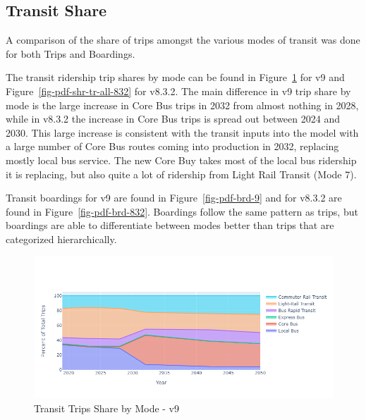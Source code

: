 \documentclass[
  letterpaper,
  DIV=11,
  numbers=noendperiod]{scrreprt}
\begin{document}
\hypertarget{transit-share}{%
\subsection{Transit Share}\label{transit-share}}

A comparison of the share of trips amongst the various modes of transit
was done for both Trips and Boardings.

The transit ridership trip shares by mode can be found in
Figure~\ref{fig-pdf-shr-tr-all-9} for v9 and
Figure~\ref{fig-pdf-shr-tr-all-832} for v8.3.2. The main difference in
v9 trip share by mode is the large increase in Core Bus trips in 2032
from almost nothing in 2028, while in v8.3.2 the increase in Core Bus
trips is spread out between 2024 and 2030. This large increase is
consistent with the transit inputs into the model with a large number of
Core Bus routes coming into production in 2032, replacing mostly local
bus service. The new Core Buy takes most of the local bus ridership it
is replacing, but also quite a lot of ridership from Light Rail Transit
(Mode 7).

Transit boardings for v9 are found in Figure~\ref{fig-pdf-brd-9} and for
v8.3.2 are found in Figure~\ref{fig-pdf-brd-832}. Boardings follow the
same pattern as trips, but boardings are able to differentiate between
modes better than trips that are categorized hierarchically.

\begin{figure}[H]

{\centering \includegraphics{v9x/v900/whats-new/_pictures/pdf-shr-tr-all-9.png}

}

\caption{\label{fig-pdf-shr-tr-all-9}Transit Trips Share by Mode - v9}

\end{figure}
\end{document}

